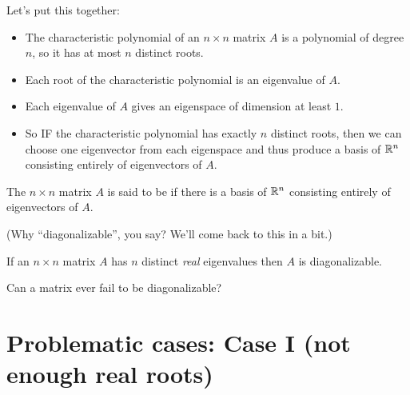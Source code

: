 Let's put this together:
\begin{itemize}
\item The characteristic polynomial of an $n\times n$ matrix $A$ is
a polynomial of degree $n$, so it has at most $n$ distinct roots.
\item Each root of the characteristic polynomial is an eigenvalue of $A$.
\item Each eigenvalue of $A$ gives an eigenspace of dimension at least $1$.
\item So IF the characteristic polynomial has exactly $n$ distinct
roots, then we can choose one eigenvector from each eigenspace and
thus produce a basis of $\mathbb{R}^n$ consisting entirely of eigenvectors
of $A$.
\end{itemize}

\begin{definition}\label{diagble}
The $n\times n$ matrix $A$ is said to be  if there
is a basis of $\mathbb{R}^n$ consisting entirely of eigenvectors of $A$.
\end{definition}

(Why ``diagonalizable'', you say?  We'll come back to this in a bit.)

\begin{fac}If an $n\times n$ matrix $A$ has $n$ distinct
{\it real} eigenvalues then $A$ is diagonalizable.\end{fac}

\medskip
Can a matrix  ever fail to be diagonalizable?
 
\section{Problematic cases: Case I (not enough real roots)}

